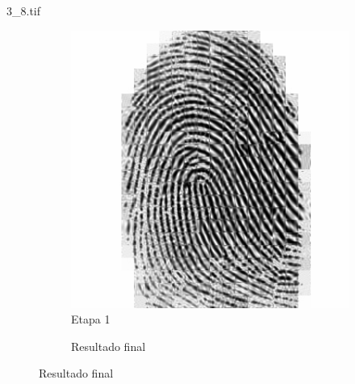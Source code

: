 \documentclass{beamer}
\begin{document}
\begin{frame}{3\_8.tif}
\begin{figure}
\begin{subfigure}[!ht]{0.32\textwidth}
                \includegraphics[width=\columnwidth]{Fingerprints/3_8_intermediate.jpg}
                \caption{Etapa 1}
            \end{subfigure}
            \begin{subfigure}[!ht]{0.32\textwidth}
                \caption{Resultado final}
            \end{subfigure}
        \end{figure}
    \end{frame}

\end{document}

